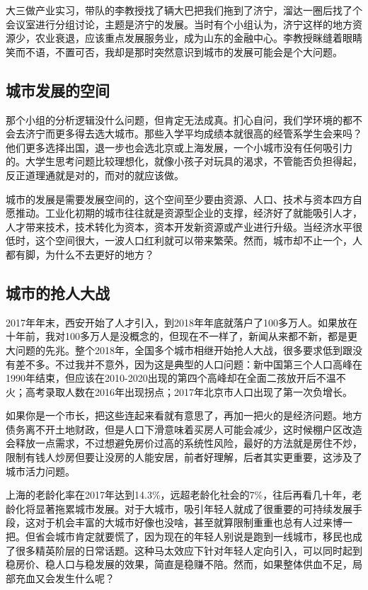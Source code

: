 \documentclass[
]{book}
\begin{document}
大三做产业实习，带队的李教授找了辆大巴把我们拖到了济宁，溜达一圈后找了个会议室进行分组讨论，主题是济宁的发展。当时有个小组认为，济宁这样的地方资源少，农业衰退，应该重点发展服务业，成为山东的金融中心。李教授眯缝着眼睛笑而不语，不置可否，我却是那时突然意识到城市的发展可能会是个大问题。

\hypertarget{ux57ceux5e02ux53d1ux5c55ux7684ux7a7aux95f4}{%
\subsection{城市发展的空间}\label{ux57ceux5e02ux53d1ux5c55ux7684ux7a7aux95f4}}

那个小组的分析逻辑没什么问题，但肯定无法成真。扪心自问，我们学环境的都不会去济宁而更多得去选大城市。那些入学平均成绩本就很高的经管系学生会来吗？他们更多选择出国，退一步也会选北京或上海发展，一个小城市没有任何吸引力的。大学生思考问题比较理想化，就像小孩子对玩具的渴求，不管能否负担得起，反正道理通就是对的，而对的就应该做。

城市的发展是需要发展空间的，这个空间至少要由资源、人口、技术与资本四方自愿推动。工业化初期的城市往往就是资源型企业的支撑，经济好了就能吸引人才，人才带来技术，技术转化为资本，资本开发新资源或产业进行升级。当经济水平很低时，这个空间很大，一波人口红利就可以带来繁荣。然而，城市却不止一个，人都有脚，为什么不去更好的地方？

\hypertarget{ux57ceux5e02ux7684ux62a2ux4ebaux5927ux6218}{%
\subsection{城市的抢人大战}\label{ux57ceux5e02ux7684ux62a2ux4ebaux5927ux6218}}

2017年年末，西安开始了人才引入，到2018年年底就落户了100多万人。如果放在十年前，我对100多万人是没概念的，但现在不一样了，新闻从来都不新，都是更大问题的先兆。整个2018年，全国多个城市相继开始抢人大战，很多要求低到跟没有差不多。不过我并不意外，因为这是典型的人口问题：新中国第三个人口高峰在1990年结束，但应该在2010-2020出现的第四个高峰却在全面二孩放开后不温不火；高考录取人数在2016年出现拐点；2017年北京市人口出现了第一次负增长。

如果你是一个市长，把这些连起来看就有意思了，再加一把火的是经济问题。地方债务离不开土地财政，但是人口下滑意味着买房人可能会减少，这时候棚户区改造会释放一点需求，不过想避免房价过高的系统性风险，最好的方法就是房住不炒，限制有钱人炒房但要让没房的人能安居，前者好理解，后者其实更重要，这涉及了城市活力问题。

上海的老龄化率在2017年达到14.3\%，远超老龄化社会的7\%，往后再看几十年，老龄化将显著拖累城市发展。对于大城市，吸引年轻人就成了很重要的可持续发展手段，这对于机会丰富的大城市好像也没啥，甚至就算限制重重也总有人过来博一把。但省会城市肯定就要慌了，因为现在的年轻人别说是跑到一线城市，移民也成了很多精英阶层的日常话题。这种马太效应下针对年轻人定向引入，可以同时起到稳房价、稳人口与稳发展的效果，简直是稳赚不陪。然而，如果整体供血不足，局部充血又会发生什么呢？
\end{document}

